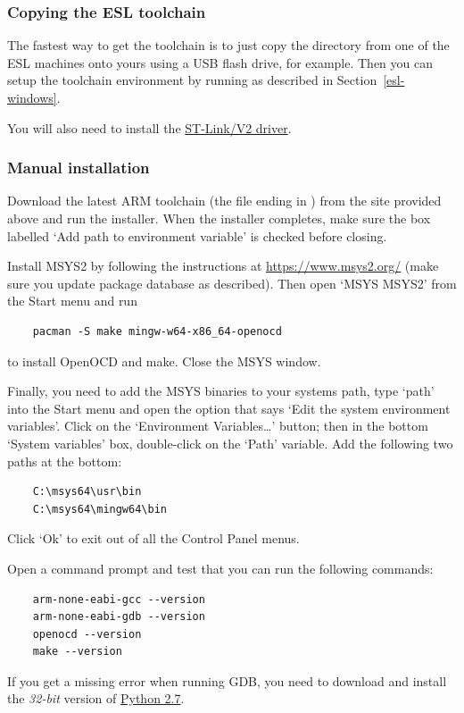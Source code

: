 \subsubsection{Copying the ESL toolchain}

The fastest way to get the toolchain is to just copy the
 directory from one of the ESL machines onto
yours using a USB flash drive, for example. Then you can setup the toolchain
environment by running
 as described in
Section~\ref{esl-windows}.

You will also need to install the
\href{https://www.st.com/en/development-tools/stsw-link009.html}{ST-Link/V2
driver}.

\subsubsection{Manual installation}

Download the latest ARM toolchain (the file ending in
) from the site provided above and
run the installer. When the installer completes, make sure the box labelled
`Add path to environment variable' is checked before closing.

Install MSYS2 by following the instructions at \url{https://www.msys2.org/}
(make sure you update package database as described). Then open `MSYS MSYS2'
from the Start menu and run
\begin{verbatim}
    pacman -S make mingw-w64-x86_64-openocd
\end{verbatim}
to install OpenOCD and make. Close the MSYS window.

Finally, you need to add the MSYS binaries to your systems path, type `path'
into the Start menu and open the option that says `Edit the system environment
variables'. Click on the `Environment Variables\ldots' button; then in the
bottom `System variables' box, double-click on the `Path' variable. Add the
following two paths at the bottom:
\begin{verbatim}
    C:\msys64\usr\bin
    C:\msys64\mingw64\bin
\end{verbatim}
Click `Ok' to exit out of all the Control Panel menus.

Open a command prompt and test that you can run the following commands:
\begin{verbatim}
    arm-none-eabi-gcc --version
    arm-none-eabi-gdb --version
    openocd --version
    make --version
\end{verbatim}
If you get a missing  error when running GDB, you need to
download and install the \emph{32-bit} version of
\href{https://www.python.org/downloads/release/python-2718/}{Python 2.7}.

